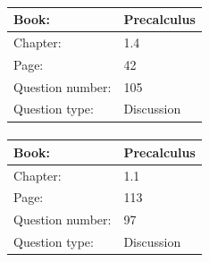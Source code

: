 \documentclass{article}
\begin{document}
            \paragraph{}
            \begin{tabularx}{1\textwidth}{
                    p{}
                    p{}
                }
                \toprule
                Book: & Precalculus
                \\
                \midrule
                Chapter: & 1.4
                \\
                \midrule
                Page: & 42
                \\
                \midrule
                Question number: & 105
                \\
                \midrule
                Question type: & Discussion
                \\
                \bottomrule
            \end{tabularx}
            
            \paragraph{}
            \begin{tabularx}{1\textwidth}{
                    p{}
                    p{}
                }
                \toprule
                Book: & Precalculus
                \\
                \midrule
                Chapter: & 1.1
                \\
                \midrule
                Page: & 113
                \\
                \midrule
                Question number: & 97
                \\
                \midrule
                Question type: & Discussion
                \\
                \bottomrule
            \end{tabularx}
            
        
\end{document}
